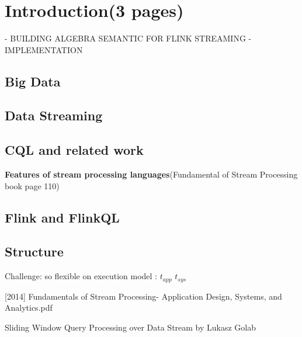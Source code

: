 
\chapter{Introduction(3 pages)}

\ifpdf
    \graphicspath{{Chapter1/Figs/Raster/}{Chapter1/Figs/PDF/}{Chapter1/Figs/}}
\else
    \graphicspath{{Chapter1/Figs/Vector/}{Chapter1/Figs/}}
\fi

- BUILDING ALGEBRA SEMANTIC FOR FLINK STREAMING
- IMPLEMENTATION
\section*{Big Data}
\section*{Data Streaming}
\section*{CQL and related work}
\textbf{Features of stream processing languages}(Fundamental of Stream Processing book page 110)


\section*{Flink and FlinkQL}
\section*{Structure}

Challenge: so flexible on execution model : $t_{app}$ $t_{sys}$



[2014] Fundamentals of Stream Processing- Application Design, Systems, and Analytics.pdf \citep{Henrique:2014}



Sliding Window Query Processing over Data Stream 
by
Lukasz Golab


